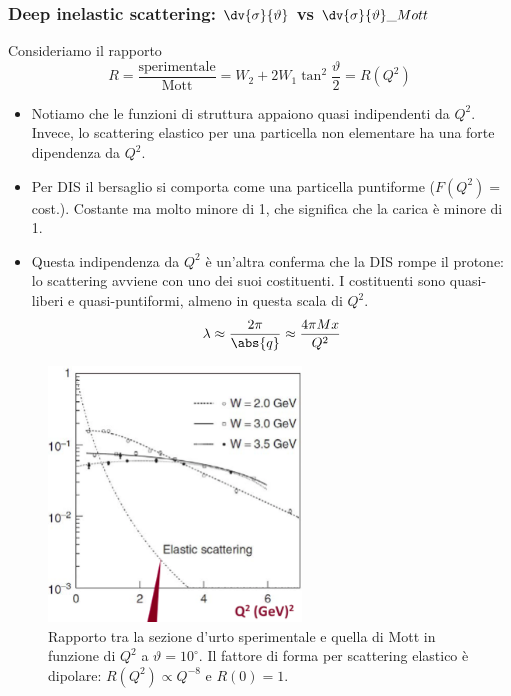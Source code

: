 \subsubsection{Deep inelastic scattering: $\dv{\sigma}{\vartheta}$ vs $\dv{\sigma}{\vartheta}\_{Mott}$}
Consideriamo il rapporto
\begin{equation*}
    R=\frac{\text{sperimentale}}{\text{Mott}}=W_2+2W_1\tan^2\frac{\vartheta}{2}=R(Q^2)
\end{equation*}
\begin{itemize}
    \item Notiamo che le funzioni di struttura appaiono quasi indipendenti da $Q^2$. Invece, lo scattering elastico per una particella non elementare ha una forte dipendenza da $Q^2$.
    \item Per DIS il bersaglio si comporta come una particella puntiforme ($F(Q^2)=$cost.). Costante ma molto minore di 1, che significa che la carica è minore di 1.
    \item Questa indipendenza da $Q^2$ è un'altra conferma che la DIS rompe il protone: lo scattering avviene con uno dei suoi costituenti. I costituenti sono quasi-liberi e quasi-puntiformi, almeno in questa scala di $Q^2$.
    \begin{equation*}
    \lambda\approx\frac{2\pi}{\abs {q}}\approx\frac{4\pi Mx}{Q^2}
    \end{equation*}
\end{itemize}
\begin{figure}[H]
    \centering
    \includegraphics[width=0.6\textwidth]{immagini/fig_dis_rapporto.png}
    \caption{Rapporto tra la sezione d'urto sperimentale e quella di Mott in funzione di $Q^2$ a $\vartheta=10^\circ$. Il fattore di forma per scattering elastico è dipolare: $R(Q^2)\propto Q^{-8}$ e $R(0)=1$.}
\end{figure}
